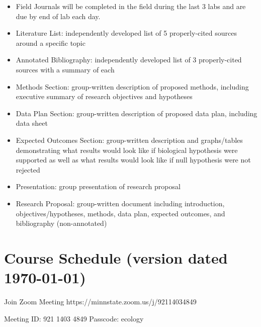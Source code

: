 \documentclass{tufte-handout}
\begin{document}
\begin{fullwidth}
\begin{itemize}
\item Field Journals will be completed in the field during the last 3 labs and are due by end of lab each day. 
\item Literature List: independently developed list of 5 properly-cited sources around a specific topic
\item Annotated Bibliography: independently developed list of 3 properly-cited sources with a summary of each 
\item Methods Section: group-written description of proposed methods, including executive summary of research objectives and hypotheses
\item Data Plan Section: group-written description of proposed data plan, including data sheet
\item Expected Outcomes Section: group-written description and graphs/tables demonstrating what results would look like if biological hypothesis were supported as well as what results would look like if null hypothesis were not rejected
\item Presentation: group presentation of research proposal
\item Research Proposal: group-written document including introduction, objectives/hypotheses, methods, data plan, expected outcomes, and bibliography (non-annotated)
\end{itemize}




\newpage









\newpage

\section{Course Schedule (version dated \today)}

Join Zoom Meeting
https://minnstate.zoom.us/j/92114034849

Meeting ID: 921 1403 4849
Passcode: ecology



\end{fullwidth}
\end{document}
